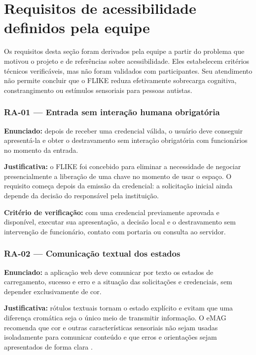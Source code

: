 \section{Requisitos de acessibilidade definidos pela equipe}

Os requisitos desta seção foram derivados pela equipe a partir do problema que motivou o projeto e de referências sobre acessibilidade. Eles estabelecem critérios técnicos verificáveis, mas não foram validados com participantes. Seu atendimento não permite concluir que o FLIKE reduza efetivamente sobrecarga cognitiva, constrangimento ou estímulos sensoriais para pessoas autistas.

\subsubsection*{RA-01 --- Entrada sem interação humana obrigatória}

\textbf{Enunciado:} depois de receber uma credencial válida, o usuário deve conseguir apresentá-la e obter o destravamento sem interação obrigatória com funcionários no momento da entrada.

\textbf{Justificativa:} o FLIKE foi concebido para eliminar a necessidade de negociar presencialmente a liberação de uma chave no momento de usar o espaço. O requisito começa depois da emissão da credencial: a solicitação inicial ainda depende da decisão do responsável pela instituição.

\textbf{Critério de verificação:} com uma credencial previamente aprovada e disponível, executar sua apresentação, a decisão local e o destravamento sem intervenção de funcionário, contato com portaria ou consulta ao servidor.

\subsubsection*{RA-02 --- Comunicação textual dos estados}

\textbf{Enunciado:} a aplicação web deve comunicar por texto os estados de carregamento, sucesso e erro e a situação das solicitações e credenciais, sem depender exclusivamente de cor.

\textbf{Justificativa:} rótulos textuais tornam o estado explícito e evitam que uma diferença cromática seja o único meio de transmitir informação. O eMAG recomenda que cor e outras características sensoriais não sejam usadas isoladamente para comunicar conteúdo e que erros e orientações sejam apresentados de forma clara \cite{brasil2014emag}.

